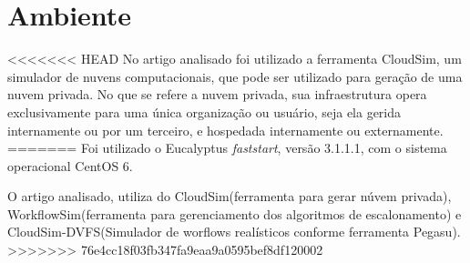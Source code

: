 \section{Ambiente}

<<<<<<< HEAD
No artigo analisado foi utilizado a ferramenta CloudSim, um simulador de nuvens computacionais,
que pode ser utilizado para geração de uma nuvem privada. No que se refere a nuvem privada,
sua infraestrutura opera exclusivamente para uma única organização ou usuário, seja ela gerida
internamente ou por um terceiro, e hospedada internamente ou externamente.
=======
Foi utilizado o Eucalyptus \textit{faststart}, versão 3.1.1.1, com o sistema operacional CentOS 6.

O artigo analisado, utiliza do CloudSim(ferramenta para gerar núvem privada), WorkflowSim(ferramenta para gerenciamento dos algoritmos de escalonamento) e CloudSim-DVFS(Simulador de worflows realísticos conforme ferramenta Pegasu).
>>>>>>> 76e4cc18f03fb347fa9eaa9a0595bef8df120002
